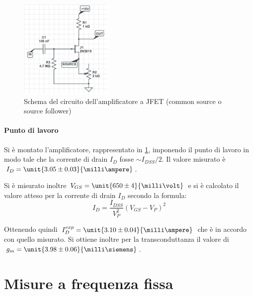 \documentclass[10pt,a4paper]{article}
\begin{document}
\begin{figure}[h!]
	\centering
	\includegraphics[width=0.4\textwidth]{../grafici/amplificatore.png}
	\caption{Schema del circuito dell'amplificatore a JFET (common source o source follower)}
	\label{fig:amplificatore}
\end{figure}

\paragraph{Punto di lavoro} Si è montato l'amplificatore, rappresentato in \figurename{\ref{fig:amplificatore}}, imponendo il punto di lavoro in modo tale che la corrente di drain $I_D$ fosse $\sim I_{DSS}/2$. Il valore misurato è $I_D = \unit{3.05 \pm 0.03}{\milli\ampere}$.


Si è misurato inoltre $V_{GS} = \unit{650 \pm 4}{\milli\volt}$ e si è calcolato il valore atteso per la corrente di drain $I_D$ secondo la formula:
\begin{equation*}
I_D = \frac{I_{DSS}}{V_P^2}(V_{GS} - V_P)^2
\end{equation*}

Ottenendo quindi $I_D^{exp} = \unit{3.10 \pm 0.04}{\milli\ampere}$ che è in accordo con quello misurato. Si ottiene inoltre per la transconduttanza il valore di $g_m = \unit{3.98 \pm 0.06}{\milli\siemens}$.

\section{Misure a frequenza fissa}
\end{document}
